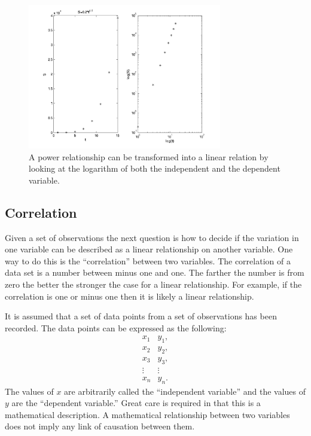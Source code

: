 \documentclass[12pt]{article}
\begin{document}
\begin{figure}[tb]
  \centerline{\includegraphics[height=2.5in]{loglog}}
  \caption{A power relationship can be transformed into a linear
    relation by looking at the logarithm of both the independent and
    the dependent variable.}
  \label{fig:loglog}
\end{figure}




\subsection{Correlation}

Given a set of observations the next question is how to decide if the
variation in one variable can be described as a linear relationship on
another variable. One way to do this is the ``correlation'' between
two variables.  The correlation of a data set is a number between
minus one and one. The farther the number is from zero the better the
stronger the case for a linear relationship. For example, if the
correlation is one or minus one then it is likely a linear
relationship.

It is assumed that a set of data points from a set of observations has
been recorded. The data points can be expressed as the following:
\begin{eqnarray}
  \label{eqn:dataPairs}
  x_1 & y_1, \\
  x_2 & y_2, \nonumber \\
  x_3 & y_3, \nonumber \\
  \vdots & \vdots \nonumber \\
  x_n & y_n. \nonumber 
\end{eqnarray}
The values of $x$ are arbitrarily called the ``independent variable''
and the values of $y$ are the ``dependent variable.''  Great care is
required in that this is a mathematical description. A mathematical
relationship between two variables does not imply any link of
causation between them.
\end{document}
